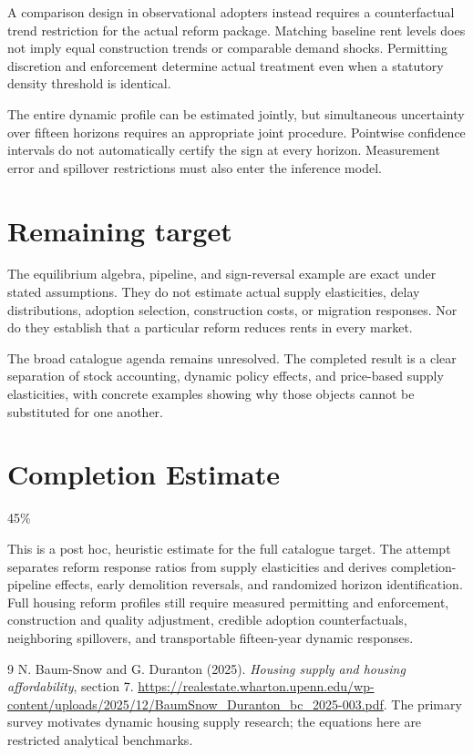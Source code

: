 \documentclass[11pt,a4paper]{article}
\begin{document}
A comparison design in observational adopters instead requires a counterfactual trend restriction for the actual reform package. Matching baseline rent levels does not imply equal construction trends or comparable demand shocks. Permitting discretion and enforcement determine actual treatment even when a statutory density threshold is identical.

The entire dynamic profile can be estimated jointly, but simultaneous uncertainty over fifteen horizons requires an appropriate joint procedure. Pointwise confidence intervals do not automatically certify the sign at every horizon. Measurement error and spillover restrictions must also enter the inference model.
\section{Remaining target}
The equilibrium algebra, pipeline, and sign-reversal example are exact under stated assumptions. They do not estimate actual supply elasticities, delay distributions, adoption selection, construction costs, or migration responses. Nor do they establish that a particular reform reduces rents in every market.

The broad catalogue agenda remains unresolved. The completed result is a clear separation of stock accounting, dynamic policy effects, and price-based supply elasticities, with concrete examples showing why those objects cannot be substituted for one another.

\section{Completion Estimate}
45\%

This is a post hoc, heuristic estimate for the full catalogue target.
The attempt separates reform response ratios from supply elasticities and derives completion-pipeline effects, early demolition reversals, and randomized horizon identification. Full housing reform profiles still require measured permitting and enforcement, construction and quality adjustment, credible adoption counterfactuals, neighboring spillovers, and transportable fifteen-year dynamic responses.

\begin{thebibliography}{9}
 N. Baum-Snow and G. Duranton (2025).
\emph{Housing supply and housing affordability}, section 7.
\url{https://realestate.wharton.upenn.edu/wp-content/uploads/2025/12/BaumSnow_Duranton_bc_2025-003.pdf}.
The primary survey motivates dynamic housing supply research; the equations here are restricted analytical benchmarks.
\end{thebibliography}
\end{document}
